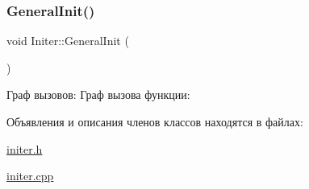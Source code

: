 \subsubsection{\texorpdfstring{General\+Init()}{GeneralInit()}}
{\footnotesize\ttfamily void Initer\+::\+General\+Init (\begin{DoxyParamCaption}{ }\end{DoxyParamCaption})\hspace{0.3cm}{\ttfamily [static]}}

Граф вызовов\+:
Граф вызова функции\+:


Объявления и описания членов классов находятся в файлах\+:\begin{DoxyCompactItemize}
\item 
\hyperlink{initer_8h}{initer.\+h}\item 
\hyperlink{initer_8cpp}{initer.\+cpp}\end{DoxyCompactItemize}
